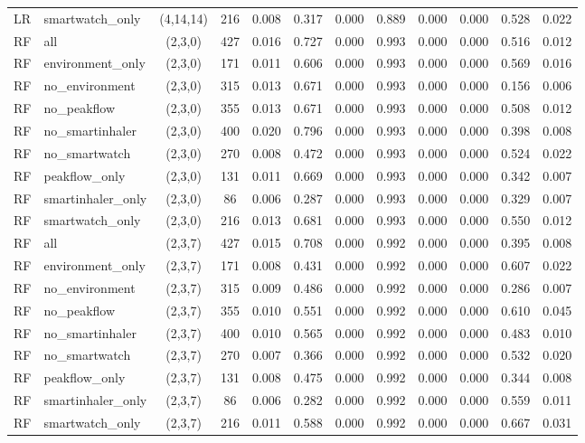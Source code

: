 \begin{longtable}{llcccccccccc}
LR & smartwatch\_only & (4,14,14) & 216 & 0.008 & 0.317 & 0.000 & 0.889 & 0.000 & 0.000 & 0.528 & 0.022 \\
RF & all & (2,3,0) & 427 & 0.016 & 0.727 & 0.000 & 0.993 & 0.000 & 0.000 & 0.516 & 0.012 \\
RF & environment\_only & (2,3,0) & 171 & 0.011 & 0.606 & 0.000 & 0.993 & 0.000 & 0.000 & 0.569 & 0.016 \\
RF & no\_environment & (2,3,0) & 315 & 0.013 & 0.671 & 0.000 & 0.993 & 0.000 & 0.000 & 0.156 & 0.006 \\
RF & no\_peakflow & (2,3,0) & 355 & 0.013 & 0.671 & 0.000 & 0.993 & 0.000 & 0.000 & 0.508 & 0.012 \\
RF & no\_smartinhaler & (2,3,0) & 400 & 0.020 & 0.796 & 0.000 & 0.993 & 0.000 & 0.000 & 0.398 & 0.008 \\
RF & no\_smartwatch & (2,3,0) & 270 & 0.008 & 0.472 & 0.000 & 0.993 & 0.000 & 0.000 & 0.524 & 0.022 \\
RF & peakflow\_only & (2,3,0) & 131 & 0.011 & 0.669 & 0.000 & 0.993 & 0.000 & 0.000 & 0.342 & 0.007 \\
RF & smartinhaler\_only & (2,3,0) & 86 & 0.006 & 0.287 & 0.000 & 0.993 & 0.000 & 0.000 & 0.329 & 0.007 \\
RF & smartwatch\_only & (2,3,0) & 216 & 0.013 & 0.681 & 0.000 & 0.993 & 0.000 & 0.000 & 0.550 & 0.012 \\
RF & all & (2,3,7) & 427 & 0.015 & 0.708 & 0.000 & 0.992 & 0.000 & 0.000 & 0.395 & 0.008 \\
RF & environment\_only & (2,3,7) & 171 & 0.008 & 0.431 & 0.000 & 0.992 & 0.000 & 0.000 & 0.607 & 0.022 \\
RF & no\_environment & (2,3,7) & 315 & 0.009 & 0.486 & 0.000 & 0.992 & 0.000 & 0.000 & 0.286 & 0.007 \\
RF & no\_peakflow & (2,3,7) & 355 & 0.010 & 0.551 & 0.000 & 0.992 & 0.000 & 0.000 & 0.610 & 0.045 \\
RF & no\_smartinhaler & (2,3,7) & 400 & 0.010 & 0.565 & 0.000 & 0.992 & 0.000 & 0.000 & 0.483 & 0.010 \\
RF & no\_smartwatch & (2,3,7) & 270 & 0.007 & 0.366 & 0.000 & 0.992 & 0.000 & 0.000 & 0.532 & 0.020 \\
RF & peakflow\_only & (2,3,7) & 131 & 0.008 & 0.475 & 0.000 & 0.992 & 0.000 & 0.000 & 0.344 & 0.008 \\
RF & smartinhaler\_only & (2,3,7) & 86 & 0.006 & 0.282 & 0.000 & 0.992 & 0.000 & 0.000 & 0.559 & 0.011 \\
RF & smartwatch\_only & (2,3,7) & 216 & 0.011 & 0.588 & 0.000 & 0.992 & 0.000 & 0.000 & 0.667 & 0.031 \\

\end{longtable}

